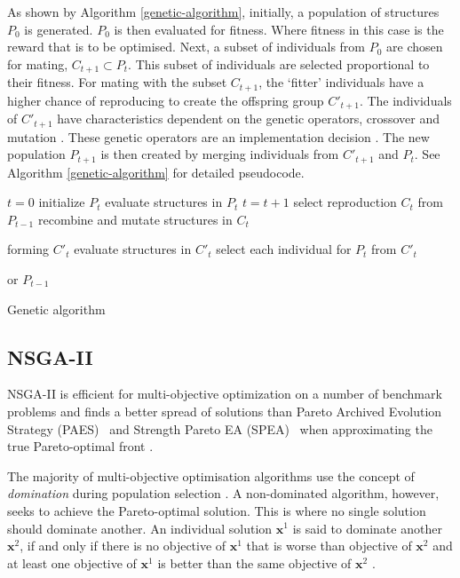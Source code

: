 \documentclass[sigconf]{acmart}
\begin{document}
As shown by Algorithm \ref{genetic-algorithm}, initially, a population of structures $P_{0}$ is generated. $P_{0}$ is then evaluated for fitness. Where fitness in this case is the reward that is to be optimised. Next, a subset of individuals from $P_{0}$ are chosen for mating, $C_{t+1} \subset P_{t}$. This subset of individuals are selected proportional to their fitness. For mating with the subset $C_{t+1}$, the `fitter' individuals have a higher chance of reproducing to create the offspring group $C'_{t+1}$. The individuals of $C'_{t+1}$ have characteristics dependent on the genetic operators, crossover and mutation \cite{mitchell1998introduction}. These genetic operators are an implementation decision \cite{FogelDavidB2009}. The new population $P_{t+1}$ is then created by merging individuals from $C'_{t+1}$ and $P_{t}$. See Algorithm \ref{genetic-algorithm} for detailed pseudocode.
%
\begin{algorithm}[t]
\begin{algorithmic}[1]
\State $t=0$
\State initialize $P_{t}$
\State evaluate structures in $P_{t}$
\State $t=t+1$
\State select reproduction $C_{t}$ from $P_{t-1}$
\State recombine and mutate structures in $C_{t}$

forming $C'_{t}$
\State evaluate structures in $C'_{t}$
\State select each individual for $P_{t}$ from $C'_{t}$ 

or $P_{t-1}$
\EndWhile
\caption{Genetic algorithm \cite{FogelDavidB2009}}
\label{genetic-algorithm}
\end{algorithmic}
\end{algorithm}



\subsection{NSGA-II}


NSGA-II is efficient for multi-objective optimization on a number of benchmark problems and finds a better spread of solutions than Pareto Archived Evolution Strategy (PAES)~\cite{Knowles1999} and Strength Pareto EA (SPEA)~\cite{Zitzler2006} when approximating the true Pareto-optimal front \cite{Valkanas2014}.

The majority of multi-objective optimisation algorithms use the concept of \emph{domination} during population selection \cite{Burke2014}. A non-dominated algorithm, however, seeks to achieve the Pareto-optimal solution. This is where no single solution should dominate another. An individual solution $\mathbf{x}^{1}$ is said to dominate another $\mathbf{x}^{2}$, if and only if there is no objective of $\mathbf{x}^{1}$ that is worse than objective of $\mathbf{x}^{2}$ and at least one objective of $\mathbf{x}^{1}$ is better than the same objective of $\mathbf{x}^{2}$ \cite{Bao2017}. 
\end{document}
